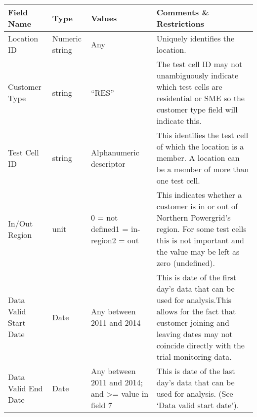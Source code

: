 \begin{table}
\centering
\begin{tabular}{|p{2cm}|p{1.5cm}|p{3cm}|p{6cm}|}
\hline
Field Name & Type           & Values                                                        & Comments \& Restrictions                                                                                                                                                                      \\ \hline
Location ID                      & Numeric string & Any                                                           & Uniquely identifies the location.                                                                                                                                                             \\ \hline
Customer Type                    & string         & “RES”                                                         & The test cell ID may not unambiguously indicate which test cells are residential or SME so the customer type field will indicate this.                                                        \\ \hline
Test Cell ID                     & string         & Alphanumeric descriptor                                       & This identifies the test cell of which the location is a member. A location can be a member of more than one test cell.                                                                       \\ \hline
In/Out Region                    & unit           & 0 = not defined1 = in-region2 = out                           & This indicates whether a customer is in or out of Northern Powergrid’s region. For some test cells this is not important and the value may be left as zero (undefined).                       \\ \hline
Data Valid Start Date            & Date           & Any between 2011 and 2014                                     & This is date of the first day’s data that can be used for analysis.This allows for the fact that customer joining and leaving dates may not coincide directly with the trial monitoring data. \\ \hline
Data Valid End Date              & Date           & Any between 2011 and 2014; and \textgreater= value in field 7 & This is date of the last day’s data that can be used for analysis. (See ‘Data valid start date’).                                                                                             \\ \hline

\end{tabular}
\end{table}
